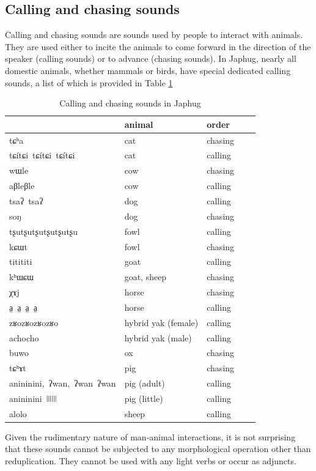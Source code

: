 \documentclass[oldfontcommands,oneside,a4paper,11pt]{article}
\newcommand{\ipa}[1]{{\phon \mbox{#1}}} %
\begin{document}
\subsection{Calling  and chasing sounds}

Calling and chasing sounds are sounds used by people to interact with animals. They are used either to incite the animals to come forward in the direction of the speaker (calling sounds) or to advance (chasing sounds). In Japhug, nearly all domestic animals, whether mammals or birds, have special dedicated calling sounds, a list of which is provided in Table \ref{tab:calling.sounds}
\begin{table}[h]
\caption{Calling and chasing sounds in Japhug} \label{tab:calling.sounds}
\begin{tabular}{lllll}
\toprule
 & 	animal & 	order \\ 	
 \midrule
\ipa{tɕʰa} & 	cat & 	chasing \\ 	
\ipa{tɕítɕi tɕítɕi tɕítɕi} & 	cat & 	calling \\ 	
\ipa{wɯle} & 	cow & 	chasing \\ 	
\ipa{aβleβle} & 	cow & 	calling \\ 	
\ipa{tsaʔ tsaʔ} & 	dog & 	calling \\ 	
\ipa{soŋ} & 	dog & 	chasing \\ 	
\ipa{tʂutʂutʂutʂutʂutʂu} & 	fowl & 	calling \\ 	
\ipa{kɕɯt} & 	fowl & 	chasing \\ 	
\ipa{titititi} & 	goat & 	calling \\ 	
\ipa{kʰɯɕɯ} & 	goat, sheep & 	chasing \\ 	
\ipa{χɤj} & 	horse & 	chasing \\ 	
\ipa{a̤ a̤ a̤ a̤} & 	horse & 	calling \\ 	
\ipa{zʁozʁozʁozʁo} & 	hybrid yak (female) & 	calling \\ 	
\ipa{achocho} & 	hybrid yak (male) & 	calling \\ 	
\ipa{buwo} & 	ox & 	chasing \\ 	
\ipa{tɕʰɤt} & 	pig & 	chasing \\ 	
\ipa{anininini, ʔwan, ʔwan ʔwan} & 	pig (adult) & 	calling \\ 	
\ipa{anininini ǀǀǀǀǀǀ} & 	pig (little) & 	calling \\ 	
\ipa{alolo} & 	sheep & 	calling \\ 	
\bottomrule
\end{tabular}
\end{table}
Given the rudimentary nature of man-animal interactions, it is not surprising that these sounds cannot be subjected to any morphological  operation other than reduplication. They cannot be used with any light verbs or occur as adjuncts.
\end{document}
